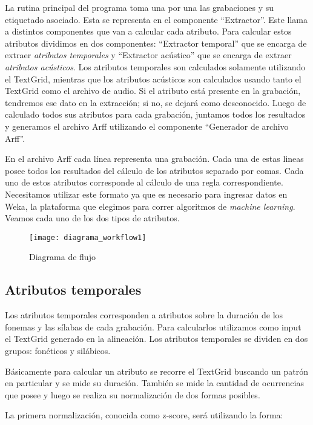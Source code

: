 La rutina principal del programa toma una por una las grabaciones y su etiquetado asociado. Esta se representa en el componente ``Extractor''. Este llama a distintos componentes que van a calcular cada atributo. Para calcular estos atributos dividimos en dos componentes: ``Extractor temporal'' que se encarga de extraer \textit{atributos temporales} y ``Extractor acústico'' que se encarga de extraer \textit{atributos acústicos}. Los atributos temporales son calculados solamente utilizando el TextGrid, mientras que los atributos acústicos son calculados usando tanto el TextGrid como el archivo de audio. Si el atributo está presente en la grabación, tendremos ese dato en la extracción; si no, se dejará como desconocido. Luego de calculado todos sus atributos para cada grabación, juntamos todos los resultados y generamos el archivo Arff utilizando el componente ``Generador de archivo Arff''.

En el archivo Arff cada línea representa una grabación.  Cada una de estas lineas posee todos los resultados del cálculo de los atributos separado por comas. Cada uno de estos atributos corresponde al cálculo de una regla correspondiente. Necesitamos utilizar este formato ya que es necesario para ingresar datos en Weka, la plataforma que elegimos para correr algoritmos de \textit{machine learning}. Veamos cada uno de los dos tipos de atributos.

\begin{figure}[h!]
    \centerline{\texttt{[image: diagrama\_workflow1]} }
    \caption{Diagrama de flujo}
    \label{workflow}
\end{figure}

\subsection{Atributos temporales}

Los atributos temporales corresponden a atributos sobre la duración de los fonemas y las sílabas de cada grabación. Para calcularlos utilizamos como input el TextGrid generado en la alineación. Los atributos temporales se dividen en dos grupos: fonéticos y silábicos. 

Básicamente para calcular un atributo se recorre el TextGrid buscando un patrón en particular y se mide su duración. También se mide la cantidad de ocurrencias que posee y luego se realiza su normalización de dos formas posibles. 

La primera normalización, conocida como z-score, será utilizando la forma:

